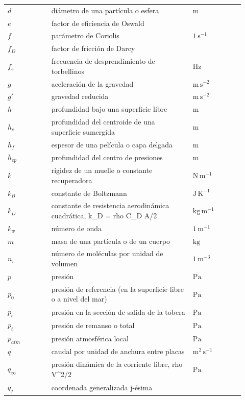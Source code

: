 \documentclass[10pt,openany]{book}
\begin{document}
\begin{longtable}{@{}>{\centering\arraybackslash}p{0.17\linewidth}>{\raggedright\arraybackslash}p{0.55\linewidth}>{\raggedright\arraybackslash}p{0.2\linewidth}@{}}
$d$ & diámetro de una partícula o esfera & $\mathrm{m}$ \\
$e$ & factor de eficiencia de Oswald &  \\
$f$ & parámetro de Coriolis & $\mathrm{1\,s^{-1}}$ \\
$f_{D}$ & factor de fricción de Darcy &  \\
$f_{s}$ & frecuencia de desprendimiento de torbellinos & $\mathrm{Hz}$ \\
$g$ & aceleración de la gravedad & $\mathrm{m\,s^{-2}}$ \\
$g'$ & gravedad reducida & $\mathrm{m\,s^{-2}}$ \\
$h$ & profundidad bajo una superficie libre & $\mathrm{m}$ \\
$h_{c}$ & profundidad del centroide de una superficie sumergida & $\mathrm{m}$ \\
$h_{f}$ & espesor de una película o capa delgada & $\mathrm{m}$ \\
$h_{cp}$ & profundidad del centro de presiones & $\mathrm{m}$ \\
$k$ & rigidez de un muelle o constante recuperadora & $\mathrm{N\,m^{-1}}$ \\
$k_{B}$ & constante de Boltzmann & $\mathrm{J\,K^{-1}}$ \\
$k_{D}$ & constante de resistencia aerodinámica cuadrática, k\_D = rho C\_D A/2 & $\mathrm{kg\,m^{-1}}$ \\
$k_{w}$ & número de onda & $\mathrm{1\,m^{-1}}$ \\
$m$ & masa de una partícula o de un cuerpo & $\mathrm{kg}$ \\
$n_{v}$ & número de moléculas por unidad de volumen & $\mathrm{1\,m^{-3}}$ \\
$p$ & presión & $\mathrm{Pa}$ \\
$p_{0}$ & presión de referencia (en la superficie libre o a nivel del mar) & $\mathrm{Pa}$ \\
$p_{e}$ & presión en la sección de salida de la tobera & $\mathrm{Pa}$ \\
$p_{t}$ & presión de remanso o total & $\mathrm{Pa}$ \\
$p_{atm}$ & presión atmosférica local & $\mathrm{Pa}$ \\
$q$ & caudal por unidad de anchura entre placas & $\mathrm{m^{2}\,s^{-1}}$ \\
$q_\infty$ & presión dinámica de la corriente libre, rho V\textasciicircum{}2/2 & $\mathrm{Pa}$ \\
$q_{j}$ & coordenada generalizada j-ésima &  \\

\end{longtable}
\end{document}
